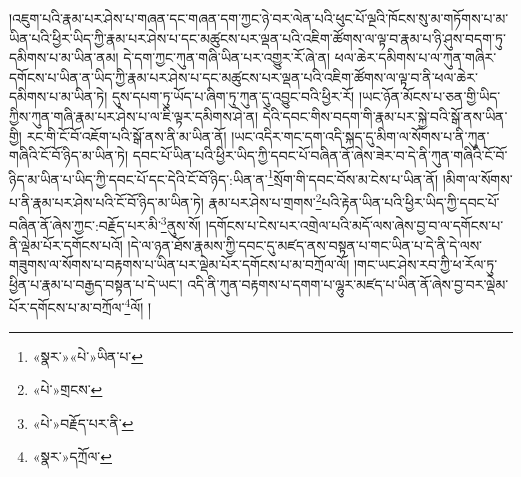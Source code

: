 །འཇུག་པའི་རྣམ་པར་ཤེས་པ་གཞན་དང་གཞན་དག་ཀྱང་ཉེ་བར་ལེན་པའི་ཕུང་པོ་ལྔའི་ཁོངས་སུ་མ་གཏོགས་པ་མ་ཡིན་པའི་ཕྱིར་ཡིད་ཀྱི་རྣམ་པར་ཤེས་པ་དང་མཚུངས་པར་ལྡན་པའི་འཇིག་ཚོགས་ལ་ལྟ་བ་རྣམ་པ་ཉི་ཤུས་བདག་ཏུ་དམིགས་པ་མ་ཡིན་ནམ། དེ་དག་ཀྱང་ཀུན་གཞི་ཡིན་པར་འགྱུར་རོ་ཞེ་ན། ཕལ་ཆེར་དམིགས་པ་ལ་ཀུན་གཞིར་དགོངས་པ་ཡིན་ན་ཡིད་ཀྱི་རྣམ་པར་ཤེས་པ་དང་མཚུངས་པར་ལྡན་པའི་འཇིག་ཚོགས་ལ་ལྟ་བ་ནི་ཕལ་ཆེར་དམིགས་པ་མ་ཡིན་ཏེ། དུས་དཔག་ཏུ་ཡོད་པ་ཞིག་ཏུ་ཀུན་དུ་འབྱུང་བའི་ཕྱིར་རོ། །ཡང་ཉོན་མོངས་པ་ཅན་གྱི་ཡིད་ཀྱིས་ཀུན་གཞི་རྣམ་པར་ཤེས་པ་ལ་ཇི་ལྟར་དམིགས་ཤེ་ན། དེའི་དབང་གིས་བདག་གི་རྣམ་པར་སྐྱེ་བའི་སྒོ་ནས་ཡིན་གྱི། རང་གི་ངོ་བོ་འཇོག་པའི་སྒོ་ནས་ནི་མ་ཡིན་ནོ། །ཡང་འདིར་གང་དག་འདི་སྐད་དུ་མིག་ལ་སོགས་པ་ནི་ཀུན་གཞིའི་ངོ་བོ་ཉིད་མ་ཡིན་ཏེ། དབང་པོ་ཡིན་པའི་ཕྱིར་ཡིད་ཀྱི་དབང་པོ་བཞིན་ནོ་ཞེས་ཟེར་བ་དེ་ནི་ཀུན་གཞིའི་ངོ་བོ་ཉིད་མ་ཡིན་པ་ཡིད་ཀྱི་དབང་པོ་དང་དེའི་ངོ་བོ་ཉིད་:ཡིན་ན་\footnote{«སྣར་»«པེ་»ཡིན་པ་}སྲོག་གི་དབང་བོས་མ་ངེས་པ་ཡིན་ནོ། །མིག་ལ་སོགས་པ་ནི་རྣམ་པར་ཤེས་པའི་ངོ་བོ་ཉིད་མ་ཡིན་ཏེ། རྣམ་པར་ཤེས་པ་གྲགས་\footnote{«པེ་»གྲངས་}པའི་རྟེན་ཡིན་པའི་ཕྱིར་ཡིད་ཀྱི་དབང་པོ་བཞིན་ནོ་ཞེས་ཀྱང་:བརྗོད་པར་མི་\footnote{«པེ་»བརྗོད་པར་ནི་}ནུས་སོ། །དགོངས་པ་ངེས་པར་འགྲེལ་པའི་མདོ་ལས་ཞེས་བྱ་བ་ལ་དགོངས་པ་ནི་ལྡེམ་པོར་དགོངས་པའོ། །དེ་ལ་ཉན་ཐོས་རྣམས་ཀྱི་དབང་དུ་མཛད་ནས་བསྟན་པ་གང་ཡིན་པ་དེ་ནི་དེ་ལས་གཟུགས་ལ་སོགས་པ་བརྟགས་པ་ཡིན་པར་ལྡེམ་པོར་དགོངས་པ་མ་བཀྲོལ་ལོ། །གང་ཡང་ཤེས་རབ་ཀྱི་ཕ་རོལ་ཏུ་ཕྱིན་པ་རྣམ་པ་བརྒྱད་བསྟན་པ་དེ་ཡང་། འདི་ནི་ཀུན་བརྟགས་པ་དགག་པ་ལྷུར་མཛད་པ་ཡིན་ནོ་ཞེས་བྱ་བར་ལྡེམ་པོར་དགོངས་པ་མ་བཀྲོལ་\footnote{«སྣར་»དཀྲོལ་}ལོ། །
